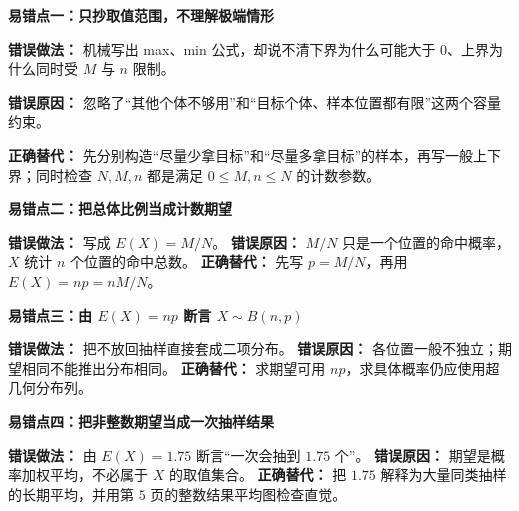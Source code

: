 \clearpage
\begin{trapbox}
	\textbf{\textcolor{CTrap}{易错点一：只抄取值范围，不理解极端情形}}

	\textbf{错误做法：} 机械写出 max、min 公式，却说不清下界为什么可能大于 $0$、上界为什么同时受 $M$ 与 $n$ 限制。

	\textbf{错误原因：} 忽略了“其他个体不够用”和“目标个体、样本位置都有限”这两个容量约束。

	

	\textbf{正确替代：} 先分别构造“尽量少拿目标”和“尽量多拿目标”的样本，再写一般上下界；同时检查 $N,M,n$ 都是满足 $0\le M,n\le N$ 的计数参数。

	\medskip
	\textbf{\textcolor{CTrap}{易错点二：把总体比例当成计数期望}}

	\textbf{错误做法：} 写成 $E(X)=M/N$。\quad
	\textbf{错误原因：} $M/N$ 只是一个位置的命中概率，$X$ 统计 $n$ 个位置的命中总数。\quad
	\textbf{正确替代：} 先写 $p=M/N$，再用 $E(X)=np=nM/N$。

	\medskip
	\textbf{\textcolor{CTrap}{易错点三：由 $E(X)=np$ 断言 $X\sim B(n,p)$}}

	\textbf{错误做法：} 把不放回抽样直接套成二项分布。\quad
	\textbf{错误原因：} 各位置一般不独立；期望相同不能推出分布相同。\quad
	\textbf{正确替代：} 求期望可用 $np$，求具体概率仍应使用超几何分布列。

	\medskip
	\textbf{\textcolor{CTrap}{易错点四：把非整数期望当成一次抽样结果}}

	\textbf{错误做法：} 由 $E(X)=1.75$ 断言“一次会抽到 $1.75$ 个”。\quad
	\textbf{错误原因：} 期望是概率加权平均，不必属于 $X$ 的取值集合。\quad
	\textbf{正确替代：} 把 $1.75$ 解释为大量同类抽样的长期平均，并用第 $5$ 页的整数结果平均图检查直觉。
\end{trapbox}
